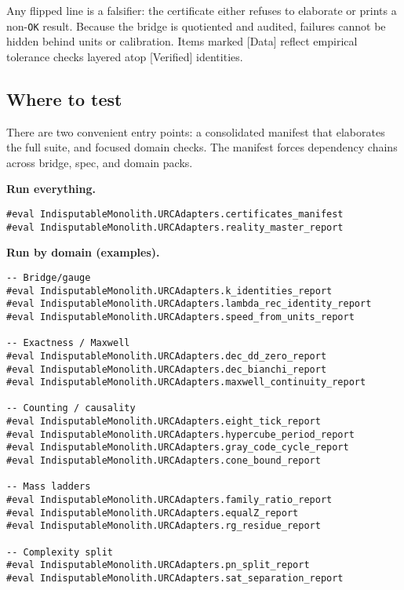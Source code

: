 \documentclass[11pt,a4paper,twoside]{article}
\numberwithin{equation}{section}
\theoremstyle{customthm}
\theoremstyle{customdef}
\theoremstyle{customrem}
\begin{document}
\begin{resultbox}[Meaning]
Any flipped line is a falsifier: the certificate either refuses to elaborate or prints a non-\texttt{OK} result. Because the bridge is quotiented and audited, failures cannot be hidden behind units or calibration. Items marked [Data] reflect empirical tolerance checks layered atop [Verified] identities.
\end{resultbox}

\subsection{Where to test}

There are two convenient entry points: a consolidated manifest that elaborates the full suite, and focused domain checks. The manifest forces dependency chains across bridge, spec, and domain packs.

\noindent\textbf{Run everything.}
\begin{lstlisting}
#eval IndisputableMonolith.URCAdapters.certificates_manifest
#eval IndisputableMonolith.URCAdapters.reality_master_report
\end{lstlisting}

\noindent\textbf{Run by domain (examples).}
\begin{lstlisting}
-- Bridge/gauge
#eval IndisputableMonolith.URCAdapters.k_identities_report
#eval IndisputableMonolith.URCAdapters.lambda_rec_identity_report
#eval IndisputableMonolith.URCAdapters.speed_from_units_report

-- Exactness / Maxwell
#eval IndisputableMonolith.URCAdapters.dec_dd_zero_report
#eval IndisputableMonolith.URCAdapters.dec_bianchi_report
#eval IndisputableMonolith.URCAdapters.maxwell_continuity_report

-- Counting / causality
#eval IndisputableMonolith.URCAdapters.eight_tick_report
#eval IndisputableMonolith.URCAdapters.hypercube_period_report
#eval IndisputableMonolith.URCAdapters.gray_code_cycle_report
#eval IndisputableMonolith.URCAdapters.cone_bound_report

-- Mass ladders
#eval IndisputableMonolith.URCAdapters.family_ratio_report
#eval IndisputableMonolith.URCAdapters.equalZ_report
#eval IndisputableMonolith.URCAdapters.rg_residue_report

-- Complexity split
#eval IndisputableMonolith.URCAdapters.pn_split_report
#eval IndisputableMonolith.URCAdapters.sat_separation_report
\end{lstlisting}
\end{document}
